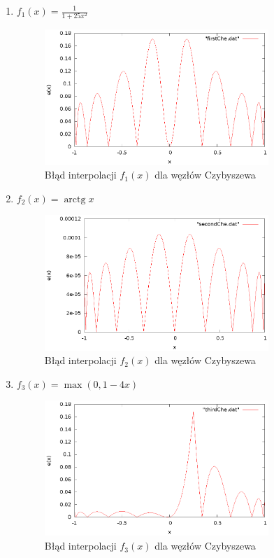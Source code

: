 \documentclass{article}
\DeclareMathOperator{\arctg}{arctg}
\begin{document}
\begin{enumerate}
\item $f_1(x) = \frac{1}{1 + 25x^2}$\\
\begin{figure}[H]
    \centering
    \includegraphics[width=0.8\textwidth]{wykresy/firstChe.eps}
    \caption{Błąd interpolacji $f_1(x)$ dla węzłów Czybyszewa}
\end{figure}

\item $f_2(x) = \arctg x$ \\
\begin{figure}[H]
    \centering
    \includegraphics[width=0.8\textwidth]{wykresy/secondChe.eps}
    \caption{Błąd interpolacji $f_2(x)$ dla węzłów Czybyszewa}
\end{figure}

\item $f_3(x) = \max(0, 1 - 4x)$\\
\begin{figure}[H]
    \centering
    \includegraphics[width=0.8\textwidth]{wykresy/thirdChe.eps}
    \caption{Błąd interpolacji $f_3(x)$ dla węzłów Czybyszewa}
\end{figure}

\end{enumerate}
\end{document}
